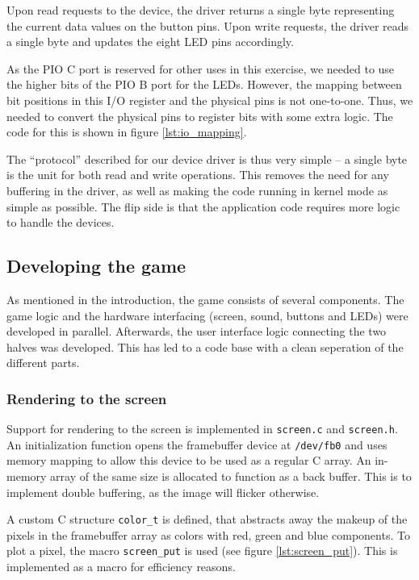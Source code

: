 Upon read requests to the device, the driver returns a single byte
representing the current data values on the button pins. Upon write
requests, the driver reads a single byte and updates the eight LED pins
accordingly.

As the PIO C port is reserved for other uses in this exercise, we needed
to use the higher bits of the PIO B port for the LEDs. However, the
mapping between bit positions in this I/O register and the physical pins
is not one-to-one. Thus, we needed to convert the physical pins to
register bits with some extra logic. The code for this is shown in
figure \ref{lst:io_mapping}.



The ``protocol'' described for our device driver is thus very simple --
a single byte is the unit for both read and write operations. This
removes the need for any buffering in the driver, as well as making the
code running in kernel mode as simple as possible. The flip side is that
the application code requires more logic to handle the devices.

\subsection{Developing the game}

As mentioned in the introduction, the game consists of several components. The
game logic and the hardware interfacing (screen, sound, buttons and
LEDs) were developed in parallel. Afterwards, the user interface logic
connecting the two halves was developed. This has led to a code base
with a clean seperation of the different parts.

\subsubsection{Rendering to the screen}

Support for rendering to the screen is implemented in \texttt{screen.c}
and \texttt{screen.h}. An initialization function opens the framebuffer
device at \texttt{/dev/fb0} and uses memory mapping to allow this device
to be used as a regular C array. An in-memory array of the same size is
allocated to function as a back buffer. This is to implement double
buffering, as the image will flicker otherwise.

A custom C structure \texttt{color\_t} is defined, that abstracts away
the makeup of the pixels in the framebuffer array as colors with red,
green and blue components. To plot a pixel, the macro
\texttt{screen\_put} is used (see figure \ref{lst:screen_put}). This is
implemented as a macro for efficiency reasons.

